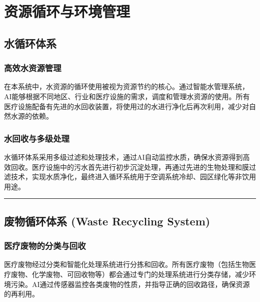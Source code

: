 \chapter{资源循环与环境管理}\label{ux8d44ux6e90ux5faaux73afux4e0eux73afux5883ux7ba1ux7406}

\section{水循环体系}\label{ux6c34ux5faaux73afux4f53ux7cfb}

\subsection{高效水资源管理}\label{ux9ad8ux6548ux6c34ux8d44ux6e90ux7ba1ux7406}

在本系统中，水资源的循环使用被视为资源节约的核心。通过智能水管理系统，AI能够根据不同地区、行业和医疗设施的需求，调度和管理水资源的使用。所有医疗设施配备有先进的水回收装置，将使用过的水进行净化后再次利用，减少对自然水源的依赖。

\subsection{水回收与多级处理}\label{ux6c34ux56deux6536ux4e0eux591aux7ea7ux5904ux7406}

水循环体系采用多级过滤和处理技术，通过AI自动监控水质，确保水资源得到高效回收。医疗设施中的污水首先进行初步沉淀处理，再通过先进的生物处理和膜过滤技术，实现水质净化，最终进入循环系统用于空调系统冷却、园区绿化等非饮用用途。

\begin{center}\rule{0.5\linewidth}{0.5pt}\end{center}

\section{废物循环体系 (Waste Recycling System)}\label{ux5e9fux7269ux5faaux73afux4f53ux7cfb-waste-recycling-system}

\subsection{医疗废物的分类与回收}\label{ux533bux7597ux5e9fux7269ux7684ux5206ux7c7bux4e0eux56deux6536}

医疗废物经过分类和智能化处理系统进行分拣和回收。所有医疗废物（包括生物医疗废物、化学废物、可回收物等）都会通过专门的处理系统进行分类存储，减少环境污染。AI通过传感器监控各类废物的性质，并指导正确的回收路径，确保资源的再利用。

